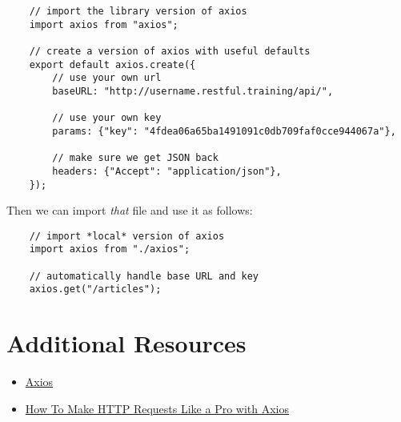\begin{verbatim}
    // import the library version of axios
    import axios from "axios";

    // create a version of axios with useful defaults
    export default axios.create({
        // use your own url
        baseURL: "http://username.restful.training/api/",

        // use your own key
        params: {"key": "4fdea06a65ba1491091c0db709faf0cce944067a"},

        // make sure we get JSON back
        headers: {"Accept": "application/json"},
    });
\end{verbatim}

Then we can import \textit{that} file and use it as follows:

\begin{verbatim}
    // import *local* version of axios
    import axios from "./axios";

    // automatically handle base URL and key
    axios.get("/articles");
\end{verbatim}



\section{Additional Resources}

\begin{itemize}[leftmargin=*]
    \item \href{https://github.com/axios/axios}{Axios}
    \item \href{https://blog.logrocket.com/how-to-make-http-requests-like-a-pro-with-axios/}{How To Make HTTP Requests Like a Pro with Axios}
\end{itemize}

